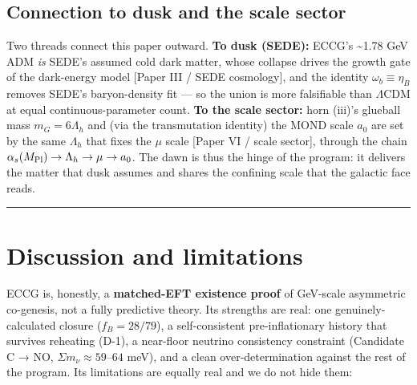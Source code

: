 \documentclass[aps,prd,preprint,nofootinbib,superscriptaddress]{revtex4-2}
\begin{document}
\subsection{Connection to dusk and the scale sector}\label{sec-10-3}

Two threads connect this paper outward. \textbf{To dusk (SEDE):} ECCG's
\textasciitilde1.78 GeV ADM \emph{is} SEDE's assumed cold dark matter,
whose collapse drives the growth gate of the dark-energy model {[}Paper
III / SEDE cosmology{]}, and the identity \(\omega_b \equiv \eta_B\)
removes SEDE's baryon-density fit --- so the union is more falsifiable
than \(\Lambda \mathrm{CDM}\) at equal continuous-parameter count.
\textbf{To the scale sector:} horn (iii)'s glueball mass
\(m_G = 6\Lambda_h\) and (via the transmutation identity) the MOND scale
\(a_0\) are set by the same \(\Lambda_h\) that fixes the \(\mu\) scale
{[}Paper VI / scale sector{]}, through the chain
\(\alpha_s(M_{\rm Pl}) \to \Lambda_h \to \mu \to a_0\). The dawn is thus
the hinge of the program: it delivers the matter that dusk assumes and
shares the confining scale that the galactic face reads.

\begin{center}\rule{0.5\linewidth}{0.5pt}\end{center}

\section{Discussion and limitations}\label{sec-11}

ECCG is, honestly, a \textbf{matched-EFT existence proof} of GeV-scale
asymmetric co-genesis, not a fully predictive theory. Its strengths are
real: one genuinely-calculated closure (\(f_B = 28/79\)), a
self-consistent pre-inflationary history that survives reheating (D-1),
a near-floor neutrino consistency constraint (Candidate C → NO,
\(\Sigma m_\nu \approx 59\text{–}64\) meV), and a clean
over-determination against the rest of the program. Its limitations are
equally real and we do not hide them:
\end{document}
